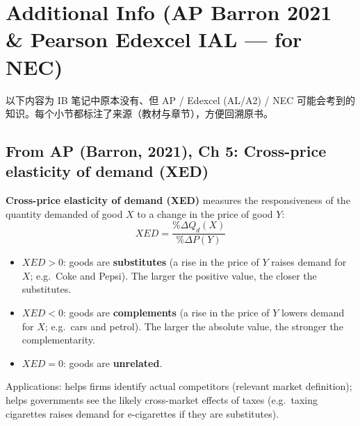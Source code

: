 \documentclass[a4paper,12pt]{article}
\newcommand{\needbold}[1]{\textcolor{red!70!black}{\textbf{#1}}}
\begin{document}
\section*{Additional Info (AP Barron 2021 \& Pearson Edexcel IAL --- for NEC)}
以下内容为 IB 笔记中原本没有、但 AP / Edexcel (AL/A2) / NEC 可能会考到的知识。每个小节都标注了来源（教材与章节），方便回溯原书。

\subsection*{From AP (Barron, 2021), Ch 5: Cross-price elasticity of demand (XED)}\label{sec:add-xed}
\needbold{Cross-price elasticity of demand (XED)} measures the responsiveness of the quantity demanded of good $X$ to a change in the price of good $Y$:
\[XED=\dfrac{\%\Delta Q_d(X)}{\%\Delta P(Y)}\]
\begin{itemize}
  \item $XED>0$: goods are \textbf{substitutes} (a rise in the price of $Y$ raises demand for $X$; e.g.\ Coke and Pepsi). The larger the positive value, the closer the substitutes.
  \item $XED<0$: goods are \textbf{complements} (a rise in the price of $Y$ lowers demand for $X$; e.g.\ cars and petrol). The larger the absolute value, the stronger the complementarity.
  \item $XED=0$: goods are \textbf{unrelated}.
\end{itemize}
Applications: helps firms identify actual competitors (relevant market definition); helps governments see the likely cross-market effects of taxes (e.g.\ taxing cigarettes raises demand for e-cigarettes if they are substitutes).
\end{document}
